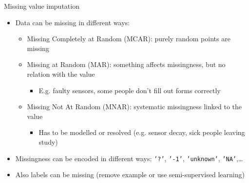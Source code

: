 \begin{frame}{Missing value imputation}

\begin{itemize}
    \item Data can be missing in different ways:
    \begin{itemize}
        \item Missing Completely at Random (MCAR): purely random points are missing
        \item Missing at Random (MAR): something affects missingness, but no relation with the value
        \begin{itemize}
            \item E.g. faulty sensors, some people don't fill out forms correctly
        \end{itemize}
        \item Missing Not At Random (MNAR): systematic missingness linked to the value
        \begin{itemize}
            \item Has to be modelled or resolved (e.g. sensor decay, sick people leaving study)
        \end{itemize}
    \end{itemize}

    \item Missingness can be encoded in different ways: \texttt{'?'}, \texttt{'-1'}, \texttt{'unknown'}, \texttt{'NA'},\ldots

    \item Also labels can be missing (remove example or use semi-supervised learning)
\end{itemize}

\end{frame}


